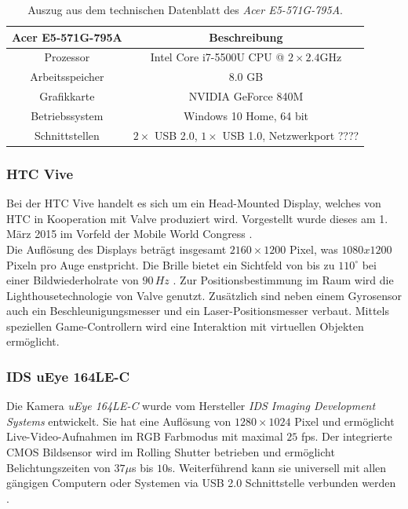 \begin{table}
	\centering
	\begin{tabular}{|c|c|}
		\hline
		\Absatzbox{}
		\textbf{Acer E5-571G-795A}& \textbf{Beschreibung} \\
		\hline
		Prozessor & Intel Core i7-5500U CPU @ $2\times 2.4$GHz  \\
		\hline
		Arbeitsspeicher & $8.0$ GB \\
		\hline 
		Grafikkarte & NVIDIA GeForce 840M\\
		\hline
		Betriebssystem & Windows 10 Home, 64 bit \\
		\hline
		Schnittstellen & $2\times$ USB 2.0, $1\times$ USB 1.0, Netzwerkport ????\\
		\hline
	\end{tabular}
	\caption{Auszug aus dem technischen Datenblatt des \textit{Acer E5-571G-795A}.}
	\label{tab:TrackingCompParam}
\end{table}


\subsubsection{HTC Vive}\label{sec:Vive} 
Bei der HTC Vive handelt es sich um ein Head-Mounted Display, welches von HTC in Kooperation mit Valve\cite{website:Valve} produziert wird. Vorgestellt wurde dieses am 1. März 2015 im Vorfeld der Mobile World Congress \cite{website:mobileworldcongress}.\\
Die Auflösung des Displays beträgt insgesamt $2160\times1200$ Pixel, was $1080x1200$ Pixeln pro Auge enstpricht. Die Brille bietet ein Sichtfeld von bis zu $110^\circ$ bei einer Bildwiederholrate von $90\,Hz$ \cite{website:HTC_Vive}. Zur Positionsbestimmung im Raum wird die Lighthousetechnologie von Valve genutzt. Zusätzlich sind neben einem Gyrosensor auch ein Beschleunigungsmesser und ein Laser-Positionsmesser verbaut. Mittels speziellen Game-Controllern wird eine Interaktion mit virtuellen Objekten ermöglicht.

\subsubsection{IDS uEye 164LE-C}\label{sec:uEye} 
Die Kamera \textit{uEye 164LE-C} wurde vom Hersteller \textit{IDS Imaging Development Systems} entwickelt. Sie hat eine Auflösung von $1280 \times 1024$ Pixel und ermöglicht Live-Video-Aufnahmen im RGB Farbmodus mit maximal $25$ fps. Der integrierte CMOS Bildsensor wird im Rolling Shutter betrieben und ermöglicht Belichtungszeiten von $37\mu$s bis $10$s. Weiterführend kann sie universell mit allen gängigen Computern oder Systemen via USB 2.0 Schnittstelle verbunden werden \cite{website:UEyeTechSpec}.\\

